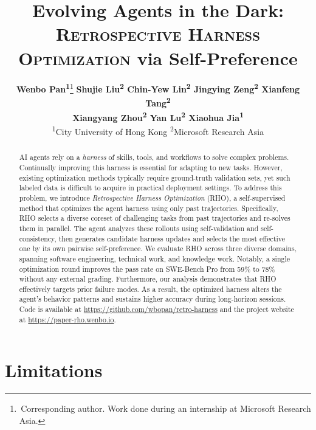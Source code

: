\documentclass[11pt]{article}
\title{Evolving Agents in the Dark: \\ \textsc{Retrospective Harness Optimization} via Self-Preference}
\author{
  \textbf{Wenbo Pan\textsuperscript{1}}\thanks{\;\,Corresponding author. Work done during an internship at Microsoft Research Asia.}\textbf{ \quad Shujie Liu\textsuperscript{2} \quad Chin-Yew Lin\textsuperscript{2} \quad Jingying Zeng\textsuperscript{2} \quad Xianfeng Tang\textsuperscript{2}} \\
  \textbf{Xiangyang Zhou\textsuperscript{2} \quad Yan Lu\textsuperscript{2} \quad Xiaohua Jia\textsuperscript{1}} \\[4pt]
  \textsuperscript{1}City University of Hong Kong \qquad \textsuperscript{2}Microsoft Research Asia
}
\newcommand{\method}{\textsc{RHO}}
\begin{document}
\maketitle

\begin{abstract}
AI agents rely on a \textit{harness} of skills, tools, and workflows to solve complex problems.
Continually improving this harness is essential for adapting to new tasks.
However, existing optimization methods typically require ground-truth validation sets, yet such labeled data is difficult to acquire in practical deployment settings.
To address this problem, we introduce \textit{Retrospective Harness Optimization} (\method{}), a self-supervised method that optimizes the agent harness using only past trajectories.
Specifically, \method{} selects a diverse coreset of challenging tasks from past trajectories and re-solves them in parallel.
The agent analyzes these rollouts using self-validation and self-consistency, then generates candidate harness updates and selects the most effective one by its own pairwise self-preference.
We evaluate \method{} across three diverse domains, spanning software engineering, technical work, and knowledge work.
Notably, a single optimization round improves the pass rate on SWE-Bench Pro from 59\% to 78\% without any external grading.
Furthermore, our analysis demonstrates that \method{} effectively targets prior failure modes. As a result, the optimized harness alters the agent's behavior patterns and sustains higher accuracy during long-horizon sessions.
Code is available at \url{https://github.com/wbopan/retro-harness} and the project website at \url{https://paper-rho.wenbo.io}.
\end{abstract}









\section*{Limitations}
\end{document}
